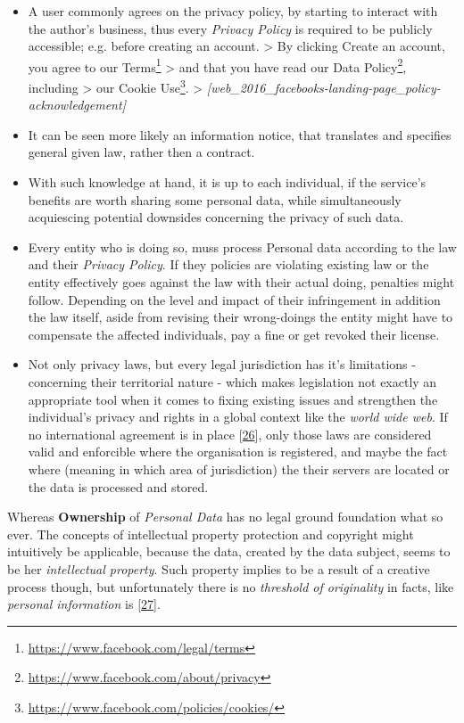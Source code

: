 \documentclass[12pt,english,a4paper,titlepage,cleardoublepage=empty,dottedtoc]{report}
\renewcommand{\href}[2]{#2\footnote{\url{#1}}}
\begin{document}
\begin{itemize}
\item
  A user commonly agrees on the privacy policy, by starting to interact
  with the author's business, thus every \emph{Privacy Policy} is
  required to be publicly accessible; e.g. before creating an account.
  \textgreater{} By clicking Create an account, you agree to our
  \href{https://www.facebook.com/legal/terms}{Terms} \textgreater{} and
  that you have read our
  \href{https://www.facebook.com/about/privacy}{Data Policy}, including
  \textgreater{} our
  \href{https://www.facebook.com/policies/cookies/}{Cookie Use}.
  \textgreater{}
  \emph{{[}web\_2016\_facebooks-landing-page\_policy-acknowledgement{]}}
\item
  It can be seen more likely an information notice, that translates and
  specifies general given law, rather then a contract.
\item
  With such knowledge at hand, it is up to each individual, if the
  service's benefits are worth sharing some personal data, while
  simultaneously acquiescing potential downsides concerning the privacy
  of such data.
\item
  Every entity who is doing so, muss process Personal data according to
  the law and their \emph{Privacy Policy}. If they policies are
  violating existing law or the entity effectively goes against the law
  with their actual doing, penalties might follow. Depending on the
  level and impact of their infringement in addition the law itself,
  aside from revising their wrong-doings the entity might have to
  compensate the affected individuals, pay a fine or get revoked their
  license.
\item
  Not only privacy laws, but every legal jurisdiction has it's
  limitations - concerning their territorial nature - which makes
  legislation not exactly an appropriate tool when it comes to fixing
  existing issues and strengthen the individual's privacy and rights in
  a global context like the \emph{world wide web}. If no international
  agreement is in place
  {[}\protect\hyperlink{ref-web_2016_international-privacy-standards}{26}{]},
  only those laws are considered valid and enforcible where the
  organisation is registered, and maybe the fact where (meaning in which
  area of jurisdiction) the their servers are located or the data is
  processed and stored.
\end{itemize}

Whereas \textbf{Ownership} of \emph{Personal Data} has no legal ground
foundation what so ever. The concepts of intellectual property
protection and copyright might intuitively be applicable, because the
data, created by the data subject, seems to be her \emph{intellectual
property}. Such property implies to be a result of a creative process
though, but unfortunately there is no \emph{threshold of originality} in
facts, like \emph{personal information} is
{[}\protect\hyperlink{ref-paper_2014_who-owns-yours-data}{27}{]}.
\end{document}
